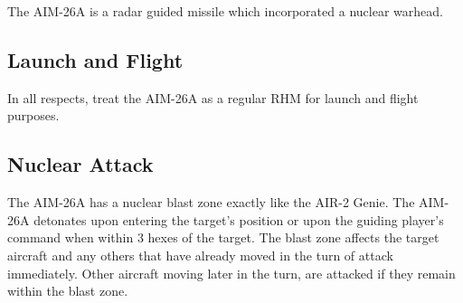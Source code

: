 \begin{advancedrules}
    The AIM-26A is a radar guided missile which incorporated a nuclear warhead.

    \subsection{Launch and Flight} In all respects, treat the AIM-26A as a regular RHM for launch and flight purposes.

    \subsection{Nuclear Attack} The AIM-26A has a nuclear blast zone exactly like the AIR-2 Genie. The AIM-26A detonates upon entering the target's position or upon the guiding player's command when within 3 hexes of the target. The blast zone affects the target aircraft and any others that have already moved in the turn of attack immediately. Other aircraft moving later in the turn, are attacked if they remain within the blast zone.

\end{advancedrules}
